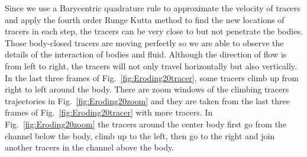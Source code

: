 \documentclass[preprint, 10pt]{elsarticle}
\begin{document}
{Since we use a Barycentric quadrature rule to approximate the velocity of tracers
and apply the fourth order Runge Kutta method to find the new locations of tracers in each step,
the tracers can be very close to but not penetrate the bodies. 
Those body-closed tracers are moving perfectly 
so we are able to observe the details of the interaction of bodies and fluid.
Although the direction of flow is from left to right, 
the tracers will not only travel horizontally but also vertically. 
In the last three frames of Fig.~\ref{fig:Eroding20tracer}, 
some tracers climb up from right to left around the body. 
There are zoom windows of the climbing tracers trajectories 
in Fig.~\ref{fig:Eroding20zoom} and they are taken from the 
last three frames of Fig.~\ref{fig:Eroding20tracer} with more tracers. 
In Fig.~\ref{fig:Eroding20zoom} the tracers around 
the center body first go from the channel below the body, 
climb up to the left, then go to the right and join another tracers 
in the channel above the body. 
 }
\end{document}
